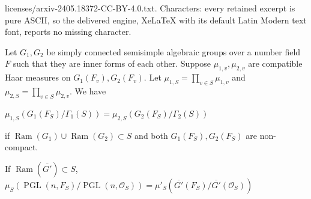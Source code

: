 \documentclass[10pt,a4paper]{amsart}
\DeclareMathOperator{\PGL}{PGL}
\DeclareMathOperator{\ram}{Ram}
\begin{document}
licenses/arxiv-2405.18372-CC-BY-4.0.txt. Characters: every retained excerpt is pure ASCII, so the delivered engine, XeLaTeX with its default Latin Modern text font, reports no missing character.
\begin{proposition}\label{pStama}
Let $G_1,G_2$ be simply connected semisimple algebraic groups over a number field $F$ such that they are inner forms of each other. 
Suppose $\mu_{1,v},\mu_{2,v}$ are compatible Haar measures on $G_1(F_v),G_2(F_v)$. 
Let $\mu_{1,S}=\prod_{v\in S}\mu_{1,v}$ and $\mu_{2,S}=\prod_{v\in S}\mu_{2,v}$. 
We have
\begin{center}
    $\mu_{1,S}(G_{1}(F_S)/\Gamma_{1}(S))=\mu_{2,S}( G_{2}(F_S)/\Gamma_{2}(S))$
\end{center}
if $\ram(G_1)\cup \ram(G_2)\subset S$ and both $G_1(F_S),G_2(F_S)$ are non-compact.  
\end{proposition}

\begin{corollary}\label{cPGLhaar=}
If $\ram(\overline{G'})\subset S$, 
$\mu_{S}(\PGL(n,F_S)/ \PGL(n,\mathcal{O}_S))=\mu'_{S}(\overline{G'}(F_S)/ \overline{G'}(\mathcal{O}_S))$
\end{corollary}
\end{document}

